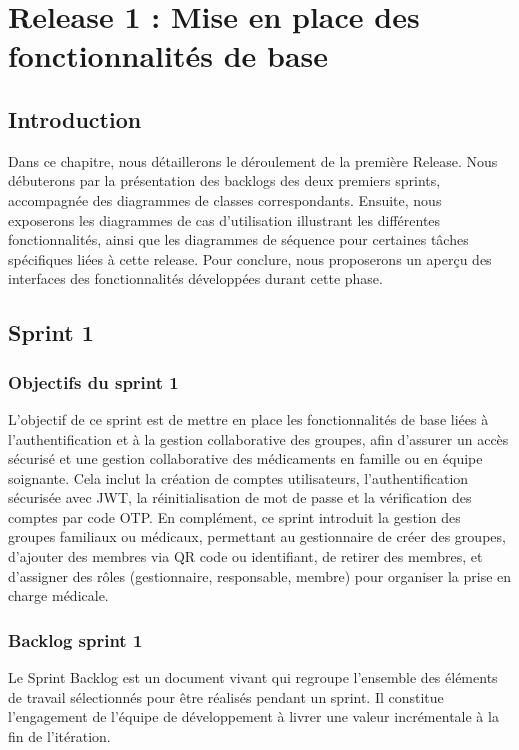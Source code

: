 \chapter {Release 1 : Mise en place des fonctionnalités de base}

\section{Introduction} 
Dans ce chapitre, nous détaillerons le déroulement de la première Release. Nous débuterons par la présentation des backlogs des deux premiers sprints, accompagnée des diagrammes de classes correspondants. Ensuite, nous exposerons les diagrammes de cas d’utilisation illustrant les différentes fonctionnalités, ainsi que les diagrammes de séquence pour certaines tâches spécifiques liées à cette release. Pour conclure, nous proposerons un aperçu des interfaces des fonctionnalités développées durant cette phase.

\section{Sprint 1}
\subsection{Objectifs du sprint 1}
L'objectif de ce sprint est de mettre en place les fonctionnalités de base liées à l'authentification et à la gestion collaborative des groupes, afin d'assurer un accès sécurisé et une gestion collaborative des médicaments en famille ou en équipe soignante. Cela inclut la création de comptes utilisateurs, l'authentification sécurisée avec JWT, la réinitialisation de mot de passe et la vérification des comptes par code OTP. En complément, ce sprint introduit la gestion des groupes familiaux ou médicaux, permettant au gestionnaire de créer des groupes, d'ajouter des membres via QR code ou identifiant, de retirer des membres, et d'assigner des rôles (gestionnaire, responsable, membre) pour organiser la prise en charge médicale.

\subsection{Backlog sprint 1}
Le Sprint Backlog est un document vivant qui regroupe l'ensemble des éléments de travail sélectionnés pour être réalisés pendant un sprint. Il constitue l'engagement de l'équipe de développement à livrer une valeur incrémentale à la fin de l'itération.

